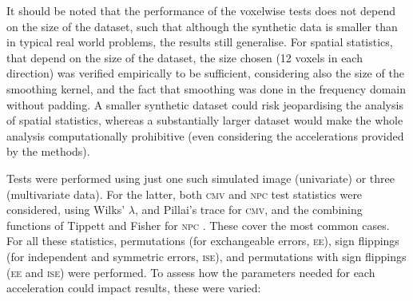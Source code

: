 It should be noted that the performance of the voxelwise tests does not depend on the size of the dataset, such that although the synthetic data is smaller than in typical real world problems, the results still generalise. For spatial statistics, that depend on the size of the dataset, the size chosen (12 voxels in each direction) was verified empirically to be sufficient, considering also the size of the smoothing kernel, and the fact that smoothing was done in the frequency domain without padding. A smaller synthetic dataset could risk jeopardising the analysis of spatial statistics, whereas a substantially larger dataset would make the whole analysis computationally prohibitive (even considering the accelerations provided by the methods).

Tests were performed using just one such simulated image (univariate) or three (multivariate data). For the latter, both \textsc{cmv} and \textsc{npc} test statistics were considered, using Wilks' $\lambda$, and Pillai's trace for \textsc{cmv}, and the combining functions of Tippett and Fisher for \textsc{npc} \citep{Winkler2016_npc}. These cover the most common cases. For all these statistics, permutations (for exchangeable errors, \textsc{ee}), sign flippings (for independent and symmetric errors, \textsc{ise}), and permutations with sign flippings (\textsc{ee} and \textsc{ise}) were performed. To assess how the parameters needed for each acceleration could impact results, these were varied:

